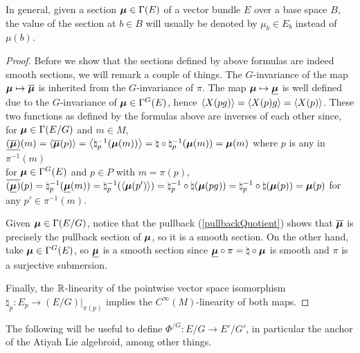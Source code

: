 In general, given a section $\bm{\mu} \in \Gamma(E)$ of a vector bundle $E$ over a base space $B$, the value of the section at $b\in B$ will usually be denoted by $\mu_b \in E_b$ instead of $\mu(b)$.

\begin{proof}
Before we show that the sections defined by above formulas are indeed smooth sections, we will remark a couple of things. The $G$-invariance of the map $\bm{\mathfrak{\mu}} \mapsto \overline{\bm{\mathfrak{\mu}}}$ is inherited from the $G$-invariance of $\pi$. The map $\bm{\mu} \mapsto \underline{\bm{\mu}}$ is well defined due to the $G$-invariance of $\bm{\mu} \in \Gamma^G(E)$, hence $\left\langle X(pg) \right\rangle = \left\langle X(p)g \right\rangle = \left\langle X(p) \right\rangle$. These two functions as defined by the formulas above are inverses of each other since, \\
for $\bm{\mathfrak{\mu}} \in \Gamma(E/G)$ and $m \in M$, $\underline{(\overline{\bm{\mathfrak{\mu}}})}(m) = \left\langle \overline{\bm{\mathfrak{\mu}}} (p) \right\rangle = \left\langle  \natural_p^{-1}(\bm{\mathfrak{\mu}}(m))  \right\rangle = \natural \circ \natural_p^{-1}(\bm{\mathfrak{\mu}}(m)) = \bm{\mathfrak{\mu}}(m)$ where $p$ is any in $\pi^{-1}(m)$ \\
for $\bm{\mu} \in \Gamma^G(E)$ and $p \in P$ with $m = \pi(p)$, $\overline{(\underline{\bm{\mu}})}(p) = \natural_p^{-1}(\underline{\bm{\mu}}(m)) = \natural_p^{-1}(\left\langle \bm{\mu}(p') \right\rangle) = \natural_p^{-1} \circ \natural (\bm{\mu}(pg)) = \natural_p^{-1} \circ \natural (\bm{\mu}(p)) = \bm{\mu}(p)$ for any $p' \in \pi^{-1}(m)$.

Given $\bm{\mathfrak{\mu}} \in \Gamma(E/G)$, notice that the pullback (\ref{pullbackQuotient}) shows that $\overline{\bm{\mathfrak{\mu}}}$ is precisely the pullback section of $\bm{\mathfrak{\mu}}$, so it is a smooth section. On the other hand, take $\bm{\mu} \in \Gamma^G(E)$, so $\underline{\bm{\mu}}$ is a smooth section since $\underline{\bm{\mu}} \circ \pi = \natural \circ \bm{\mu}$ is smooth and $\pi$ is a surjective submersion.

Finally, the $\mathbb{R}$-linearity of the pointwise vector space isomorphism $\natural_p:E_p \to (E/G)|_{\pi(p)}$ implies the $C^{\infty}(M)$-linearity of both maps.

\end{proof}

The following will be useful to define $\Phi^{/G}: E/G \to E'/G'$, in particular the anchor of the Atiyah Lie algebroid, among other things. 

